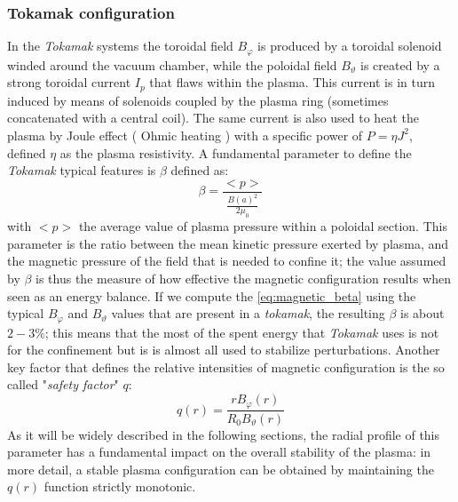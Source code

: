 \subsubsection{Tokamak configuration}
In the \textit{Tokamak} systems the toroidal field $B_\varphi$ is produced by a toroidal solenoid winded around the vacuum chamber, while the poloidal field $B_\vartheta$ is created by a strong toroidal current $I_p$ that flaws within the plasma. This current is in turn induced by means of solenoids coupled by the plasma ring (sometimes concatenated with a central coil). The same current is also used to heat the plasma by Joule effect ( Ohmic heating ) with a specific power of $P = \eta J^2$, defined $\eta$ as the plasma resistivity.
%
A fundamental parameter to define the \textit{Tokamak} typical features is $\beta$ defined as:
\begin{equation}
    \beta = \frac{<p>}{ \frac{B(a)^2}{2\mu_0} }
    \label{eq:magnetic_beta}
\end{equation}
with $<p>$ the average value of plasma pressure within a poloidal section. This parameter is the ratio between the mean kinetic pressure exerted by plasma, and the magnetic pressure of the field that is needed to confine it; the value assumed by $\beta$ is thus the measure of how effective the magnetic configuration results when seen as an energy balance.
If we compute the \eqref{eq:magnetic_beta} using the typical $B_\varphi$ and $B_\vartheta$ values that are present in a \textit{tokamak}, the resulting $\beta$ is about $2-3\%$; this means that the most of the spent energy that \textit{Tokamak} uses is not for the confinement but is is almost all used to stabilize perturbations.
Another key factor that defines the relative intensities of magnetic configuration is the so called "\textit{safety factor}" $q$:
\begin{equation}
    q(r) = \frac{rB_\varphi(r)}{R_0B_\vartheta(r)}
\end{equation}
As it will be widely described in the following sections, the radial profile of this parameter has a fundamental impact on the overall stability of the plasma: in more detail, a stable plasma configuration can be obtained by maintaining the $q(r)$ function strictly monotonic.
